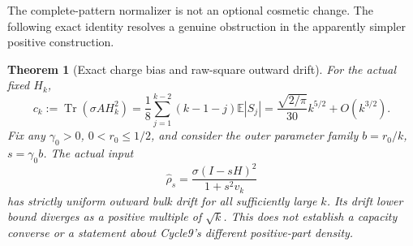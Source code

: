 \documentclass[11pt]{article}
\newtheorem{theorem}{Theorem}[section]
\newcommand{\Tr}{\operatorname{Tr}}
\newcommand{\E}{\mathbb E}
\begin{document}
The complete-pattern normalizer is not an optional cosmetic change.
The following exact identity resolves a genuine obstruction in the
apparently simpler positive construction.

\begin{theorem}[Exact charge bias and raw-square outward drift]
\label{thm:rawsquare}
For the actual fixed \(H_k\),
\begin{equation}\label{eq:chargeidentity}
 c_k:=\Tr(\sigma A H_k^2)
 =\frac18\sum_{j=1}^{k-2}(k-1-j)\E|S_j|
 =\frac{\sqrt{2/\pi}}{30}k^{5/2}+O(k^{3/2}).
\end{equation}
Fix any \(\gamma_0>0\), \(0<r_0\le1/2\), and consider the outer
parameter family \(b=r_0/k\), \(s=\gamma_0b\). The actual input
\[
 \widehat\rho_s=\frac{\sigma(I-sH)^2}{1+s^2v_k}
\]
has strictly uniform outward bulk drift for all sufficiently large \(k\).
Its drift lower bound diverges as a positive multiple of \(\sqrt k\).
This does not establish a capacity converse or a statement about Cycle9's
different positive-part density.
\end{theorem}
\end{document}
